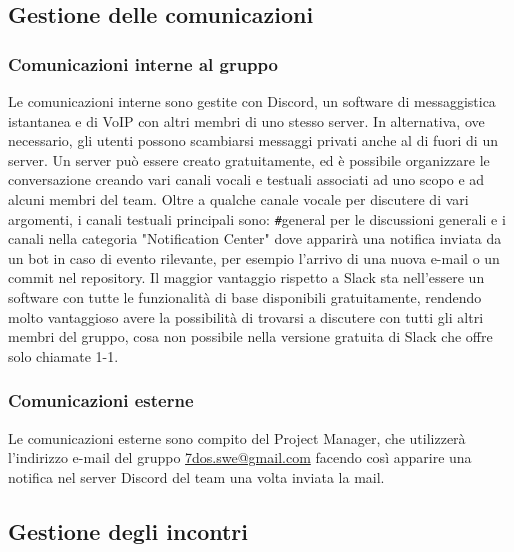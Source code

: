 \subsection{Gestione delle comunicazioni}
\subsubsection{Comunicazioni interne al gruppo}
Le comunicazioni interne sono gestite con Discord, un software di messaggistica istantanea e di VoIP con altri membri di uno stesso server. In alternativa, ove necessario, gli utenti possono scambiarsi messaggi privati anche al di fuori di un server.
Un server può essere creato gratuitamente, ed è possibile organizzare le conversazione creando vari canali vocali e testuali associati ad uno scopo e ad alcuni membri del team.\newline
Oltre a qualche canale vocale per discutere di vari argomenti, i canali testuali principali sono: \verb|#|general per le discussioni generali e i canali nella categoria "Notification Center" dove apparirà una notifica inviata da un bot in caso di evento rilevante, per esempio l'arrivo di una nuova e-mail o un commit nel repository.
\newline
Il maggior vantaggio rispetto a Slack sta nell'essere un software con tutte le funzionalità di base disponibili gratuitamente, rendendo molto vantaggioso avere la possibilità di trovarsi a discutere con tutti gli altri membri del gruppo, cosa non possibile nella versione gratuita di Slack che offre solo chiamate 1-1.

\subsubsection{Comunicazioni esterne}
Le comunicazioni esterne sono compito del Project Manager, che utilizzerà l'indirizzo e-mail del gruppo \href{mailto:7dos.swe@gmail.com}{7dos.swe@gmail.com} facendo così apparire una notifica nel server Discord del team una volta inviata la mail.

\subsection{Gestione degli incontri}
